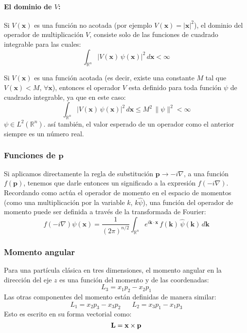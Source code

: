 \documentclass[12pt]{book}
\numberwithin{equation}{chapter}
\def\R{\mathbb{R}}
\def\rar{\rightarrow}
\def\x{\mathbf{x}}
\def\k{\mathbf{k}}
\def\P{\mathbf{p}}
\begin{document}
\paragraph{El dominio de $V$:} 
Si $V(\x)$ es una funci\'on no acotada (por ejemplo $V(\x)= |\x|^{2}$), el dominio del operador de multiplicaci\'on $V$, consiste solo de las funciones de cuadrado integrable para las cuales:
\begin{equation}
\int_{\R^{n}} |V(\x) \, \psi (\x)|^{2} \, d\x < \infty
\end{equation}
 
Si $V(\x)$ es una funci\'on acotada (es decir, existe una constante $M$ tal que $V(\x)<M$, $\forall \x$), entonces el operador $V$ esta definido para toda funci\'on $\psi$ de cuadrado integrable, ya que en este caso:
\begin{equation}
\int_{\R^{n}} |V(\x)\, \psi(\x)|^{2} \, d\x \leq M^{2}\, \| \psi \|^{2} < \infty 
\end{equation}
$ \psi \in L^{2}(\R^{n})$. as\'i tambi\'en, el valor esperado de un operador como el anterior siempre es un n\'umero real.

\subsubsection{Funciones de $\P$}
Si aplicamos directamente la regla de substituci\'on $ \P \rar -i \nabla $, a una funci\'on $f(\P)$, tenemos que darle entonces un significado a la expresi\'on $f(-i \nabla)$. Recordando como act\'ua el operador de momento en el espacio de momentos (como una multiplicaci\'on por la variable $k$, $k \hat{\psi}$), una funci\'on del operador de momento puede ser definida a trav\'es de la transformada de Fourier:
\begin{equation}
f( -i \nabla ) \psi(\x) = \frac{1}{(2\pi)^{n/2}} \int_{\R^{n}} e^{i \k \cdot \x} \, f(\k)\, \hat{\psi} (\k) \, d \k
\end{equation}
 
\subsubsection{Momento angular}
Para una part\'icula cl\'asica en tres dimensiones, el momento angular en la direcci\'on del eje $z$ es una funci\'on del momento y de las coordenadas:
\begin{equation}
L_{3}= x_{1}p_{2}-x_{2}p_{1}
\end{equation}
Las otras componentes del momento est\'an definidas de manera similar:
\begin{equation}
L_{1}= x_{2}p_{3} - x_{3}p_{2} \,\,\,\,\,\,\,\,\,\, L_{2}= x_{3}p_{1} - x_{1}p_{3}
\end{equation}
Esto es escrito en su forma vectorial como:
\begin{equation}
\bf{L}= \x \times \P
\end{equation}
\end{document}
